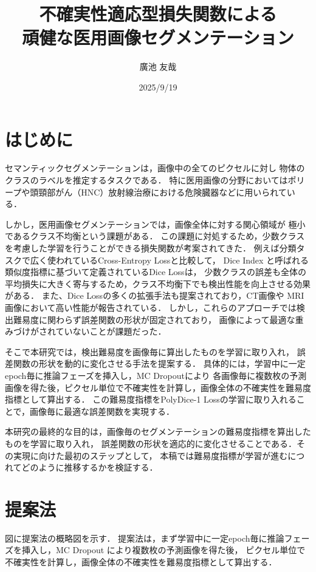 \documentclass[10pt, a4paper, twocolumn]{jarticle}
\title{不確実性適応型損失関数による \\
頑健な医用画像セグメンテーション}
\author{廣池 友哉}
\affiliation{広島大学 大学院先進理工系科学研究科 情報科学プログラム}
\date{2025/9/19}
\begin{document}
\maketitle


\section{はじめに}
セマンティックセグメンテーションは，画像中の全てのピクセルに対し
物体のクラスのラベルを推定するタスクである．
特に医用画像の分野においてはポリープ\cite{ji2022video}や頭頸部がん（HNC）放射線治療における危険臓器\cite{maleki2020machine}などに用いられている．

しかし，医用画像セグメンテーションでは，画像全体に対する関心領域が
極小であるクラス不均衡という課題がある．
この課題に対処するため，少数クラスを考慮した学習を行うことができる損失関数が考案されてきた．
例えば分類タスクで広く使われているCross-Entropy Loss\cite{long2015fully}と比較して，
Dice Index と呼ばれる類似度指標に基づいて定義されているDice Loss\cite{milletari2016v}は，
少数クラスの誤差も全体の平均損失に大きく寄与するため，クラス不均衡下でも検出性能を向上させる効果がある．
また、Dice Lossの多くの拡張手法も提案されており，CT画像\cite{zhu2019anatomynet, 9109297}や
MRI画像\cite{KATO2024107695}において高い性能が報告されている．
しかし，これらのアプローチでは検出難易度に関わらず誤差関数の形状が固定されており，
画像によって最適な重みづけがされていないことが課題だった．

そこで本研究では，検出難易度を画像毎に算出したものを学習に取り入れ，
誤差関数の形状を動的に変化させる手法を提案する．
具体的には，学習中に一定epoch毎に推論フェーズを挿入し，MC Dropout\cite{pmlr-v48-gal16}により
各画像毎に複数枚の予測画像を得た後，ピクセル単位で不確実性を計算し，画像全体の不確実性を難易度指標として算出する．
この難易度指標をPolyDice-1 Lossの学習に取り入れることで，画像毎に最適な誤差関数を実現する．

本研究の最終的な目的は，画像毎のセグメンテーションの難易度指標を算出したものを学習に取り入れ，
誤差関数の形状を適応的に変化させることである．その実現に向けた最初のステップとして，
本稿では難易度指標が学習が進むにつれてどのように推移するかを検証する．

\section{提案法}
図に提案法の概略図を示す．
提案法は，まず学習中に一定epoch毎に推論フェーズを挿入し，MC Dropout により複数枚の予測画像を得た後，
ピクセル単位で不確実性を計算し，画像全体の不確実性を難易度指標として算出する．
\end{document}
